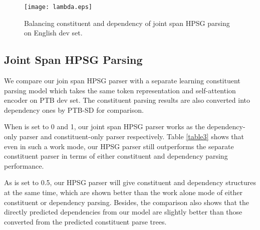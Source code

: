\documentclass[11pt,a4paper]{article}
\begin{document}
\begin{figure}[t!]
    \centering
    \texttt{[image: lambda.eps]}
    
    \caption{Balancing constituent and dependency of joint span HPSG parsing on English dev set.}
    \label{fig4}
\end{figure}


\subsection{Joint Span HPSG Parsing}

We compare our join span HPSG parser with a separate learning constituent parsing model which takes the same token representation and self-attention encoder on PTB dev set.
The constituent parsing results are also converted into dependency ones by PTB-SD for comparison.

When  is set to 0 and 1, our joint span HPSG parser works as the dependency-only parser and constituent-only parser respectively. Table \ref{table3} shows that even in such a work mode, our HPSG parser still outperforms the separate constituent parser in terms of either constituent and dependency parsing performance.

As  is set to 0.5, our HPSG parser will give constituent and dependency structures at the same time, which are shown better than the work alone mode of either constituent or dependency parsing. Besides, the comparison also shows that the directly predicted dependencies from our model are slightly better than those converted from the predicted constituent parse trees.
\begin{table}[t!]
    \centering
    \caption{\label{table3} Parsing speed on the PTB dataset.}
\end{table}
\end{document}
